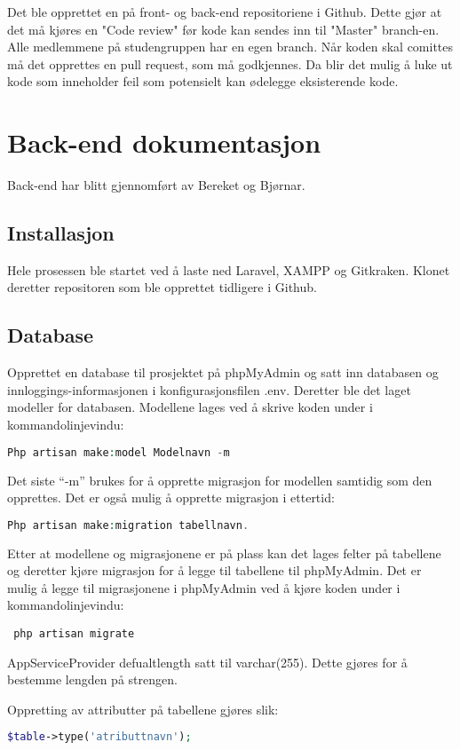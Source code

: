 Det ble opprettet en  på front- og back-end repositoriene i Github. Dette gjør at det må kjøres en "Code review" før kode kan sendes inn til "Master" branch-en. Alle medlemmene på studengruppen har en egen branch.
Når koden skal comittes må det opprettes en pull request, som må godkjennes. Da blir det mulig å luke ut kode som inneholder feil som potensielt kan ødelegge eksisterende kode.

\section{Back-end dokumentasjon}
Back-end har blitt gjennomført av Bereket og Bjørnar. 

\subsection{Installasjon}
Hele prosessen ble startet ved å laste ned Laravel, XAMPP og Gitkraken. Klonet deretter repositoren som ble opprettet tidligere i Github.

\subsection{Database}
Opprettet en database til prosjektet på phpMyAdmin og satt inn databasen og innloggings-informasjonen i konfigurasjonsfilen .env. Deretter ble det laget modeller for databasen. Modellene lages ved å skrive koden under i kommandolinjevindu: 
\begin{lstlisting}[language=PHP]
    Php artisan make:model Modelnavn -m
\end{lstlisting}  
Det siste “-m” brukes for å opprette migrasjon for modellen  samtidig som den opprettes. Det er også mulig å opprette migrasjon i ettertid: 
 \begin{lstlisting}[language=PHP]
    Php artisan make:migration tabellnavn.
\end{lstlisting}
Etter at modellene og migrasjonene er på plass kan det lages felter på tabellene og deretter kjøre migrasjon for å legge til tabellene til phpMyAdmin. Det er mulig å legge til migrasjonene i phpMyAdmin ved å kjøre koden under i kommandolinjevindu:
\begin{lstlisting}
 php artisan migrate 
\end{lstlisting}

AppServiceProvider defualtlength satt til varchar(255). Dette gjøres for å bestemme lengden på strengen.

Oppretting av  attributter på tabellene gjøres slik: 
\begin{lstlisting}[language=PHP]
    $table->type('atributtnavn');
\end{lstlisting}

